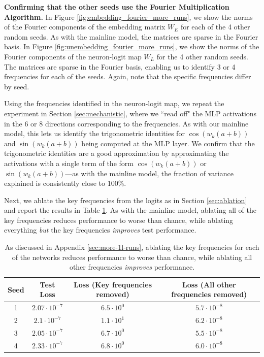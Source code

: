 \documentclass{article} %
\newcommand{\cosp}[1]{\cos \left ( #1 \right )}
\newcommand{\sinp}[1]{\sin \left ( #1 \right )}
\begin{document}
\textbf{Confirming that the other seeds use the Fourier Multiplication Algorithm.} In Figure \ref{fig:embedding_fourier_more_runs}, we show the norms of the Fourier components of the embedding matrix $W_E$ for each of the 4 other random seeds. As with the mainline model, the matrices are sparse in the Fourier basis. In Figure \ref{fig:unembedding_fourier_more_runs}, we show the norms of the Fourier components of the neuron-logit map $W_L$ for the 4 other random seeds. The matrices are sparse in the Fourier basis, enabling us to identify 3 or 4 \kf{} frequencies for each of the seeds. Again, note that the specific frequencies differ by seed.

Using the \kf{} frequencies identified in the neuron-logit map, we repeat the experiment in Section \ref{sec:mechanistic}, where we ``read off" the MLP activations in the 6 or 8 directions corresponding to the \kf{} frequencies. As with our mainline model, this lets us identify the trigonometric identities for $\cosp{w_k (a+b)}$ and $\sinp{w_k (a+b)}$ being computed at the MLP layer. We confirm that the trigonometric identities are a good approximation by approximating the activations with a single term of the form $\cosp{w_k (a+b)}$ or $\sinp{w_k (a+b)}$---as with the mainline model, the fraction of variance explained is consistently close to 100\%. 

Next, we ablate the key frequencies from the logits as in Section \ref{sec:ablation} and report the results in Table \ref{tab:more-ablations}. As with the mainline model, ablating all of the key frequencies reduces performance to worse than chance, while ablating everything \textit{but} the key frequencies \textit{improves} test performance. 

\begin{table}[]
    \centering
    \small
    \begin{tabular}{c|c|c|c}
         Seed & Test Loss & Loss (Key frequencies removed) & Loss (All other frequencies removed)  \\
         \hline 
         1 & $2.07 \cdot 10^{-7}$ & $6.5 \cdot 10^0$ & $5.7 \cdot 10^{-8}$ \\
         2 & $2.1 \cdot 10^{-7} $ & $1.1 \cdot 10^1$ & $6.2 \cdot 10^{-8}$ \\
         3 & $2.05 \cdot 10^{-7} $& $6.7 \cdot 10^0$ & $5.5 \cdot 10^{-8}$\\
         4 & $2.33 \cdot 10^{-7}$ & $6.8 \cdot 10^0$ & $6.0 \cdot 10^{-8}$ \\
    \end{tabular}
    \caption{As discussed in Appendix \ref{sec:more-1l-runs}, ablating the key frequencies for each of the networks reduces performance to worse than chance, while ablating all other frequencies \textit{improves} performance.}
    \label{tab:more-ablations}
\end{table}
\end{document}
